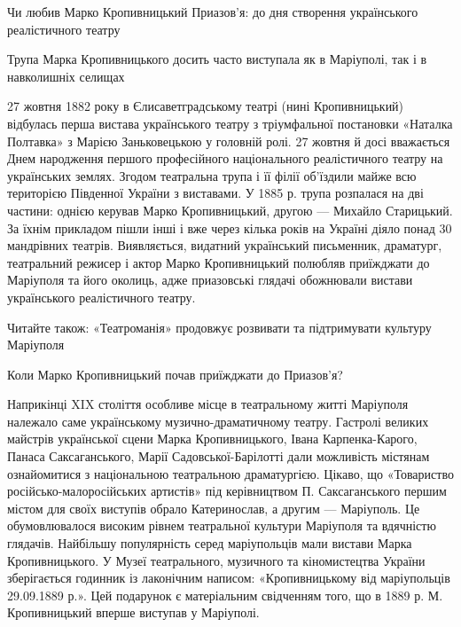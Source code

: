  
 
 
 
 

Чи любив Марко Кропивницький Приазов'я: до дня створення українського
реалістичного театру

Трупа Марка Кропивницького досить часто виступала як в Маріуполі, так і в
навколишніх селищах

27 жовтня 1882 року в Єлисаветградському театрі (нині Кропивницький) відбулась
перша вистава українського театру з тріумфальної постановки «Наталка Полтавка»
з Марією Заньковецькою у головній ролі. 27 жовтня й досі вважається Днем
народження першого професійного національного реалістичного театру на
українських землях. Згодом театральна трупа і її філії об'їздили майже всю
територією Південної України з виставами. У 1885 р. трупа розпалася на дві
частини: однією керував Марко Кропивницький, другою — Михайло Старицький. За
їхнім прикладом пішли інші і вже через кілька років на Україні діяло понад 30
мандрівних театрів. Виявляється, видатний український письменник, драматург,
театральний режисер і актор Марко Кропивницький полюбляв приїжджати до
Маріуполя та його околиць, адже приазовські глядачі обожнювали вистави
українського реалістичного театру.

Читайте також: «Театроманія» продовжує розвивати та підтримувати культуру
Маріуполя

Коли Марко Кропивницький почав приїжджати до Приазов'я?

Наприкінці XIX століття особливе місце в театральному житті Маріуполя належало
саме українському музично-драматичному театру. Гастролі великих майстрів
української сцени Марка Кропивницького, Івана Карпенка-Карого, Панаса
Саксаганського, Марії Садовської-Барілотті дали можливість містянам
ознайомитися з національною театральною драматургією. Цікаво, що «Товариство
російсько-малоросійських артистів» під керівництвом П. Саксаганського першим
містом для своїх виступів обрало Катеринослав, а другим — Маріуполь. Це
обумовлювалося високим рівнем театральної культури Маріуполя та вдячністю
глядачів. Найбільшу популярність серед маріупольців мали вистави Марка
Кропивницького. У Музеї театрального, музичного та кіномистецтва України
зберігається годинник із лаконічним написом: «Кропивницькому від маріупольців
29.09.1889 р.». Цей подарунок є матеріальним свідченням того, що в 1889 р. М.
Кропивницький вперше виступав у Маріуполі.


